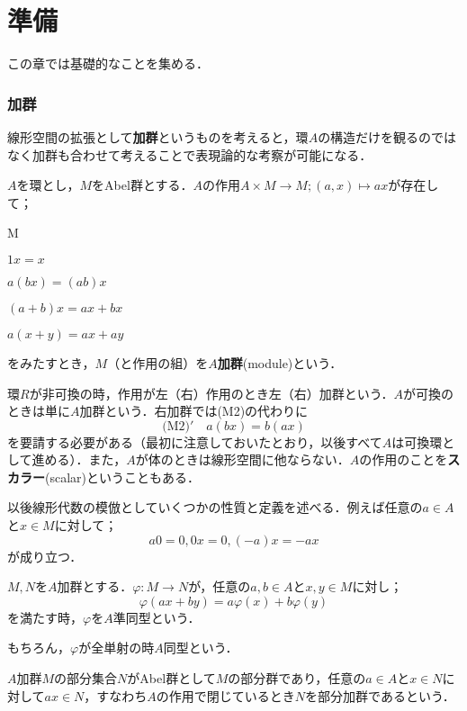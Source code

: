 \part[Preliminaries]{準備}
この章では基礎的なことを集める．

\section{加群}

線形空間の拡張として\textbf{加群}というものを考えると，環$A$の構造だけを観るのではなく加群も合わせて考えることで表現論的な考察が可能になる．

\begin{defi}[加群]
	$A$を環とし，$M$をAbel群とする．$A$の作用$A\times M\to M;(a,x)\mapsto ax$が存在して；
	\begin{defiterm}{M}
		\item $1x=x$
		\item $a(bx)=(ab)x$
		\item $(a+b)x=ax+bx$
		\item $a(x+y)=ax+ay$
	\end{defiterm}
	をみたすとき，$M$（と作用の組）を$A$\textbf{加群}(module)という．
\end{defi}

環$R$が非可換の時，作用が左（右）作用のとき左（右）加群という．$A$が可換のときは単に$A$加群という．右加群では(M2)の代わりに
\[\textrm{(M2)}'\quad a(bx)=b(ax)\]
を要請する必要がある（最初に注意しておいたとおり，以後すべて$A$は可換環として進める）．また，$A$が体のときは線形空間に他ならない．$A$の作用のことを\textbf{スカラー}(scalar)ということもある．

以後線形代数の模倣としていくつかの性質と定義を述べる．例えば任意の$a\in A$と$x\in M$に対して；
\[a0=0,0x=0,(-a)x=-ax\]
が成り立つ．

\begin{defi}[準同型]
	$M,N$を$A$加群とする．$\varphi:M\to N$が，任意の$a,b\in A$と$x,y\in M$に対し；
	\[\varphi(ax+by)=a\varphi(x)+b\varphi(y)\]
	を満たす時，$\varphi$を$A$準同型という．
\end{defi}

もちろん，$\varphi$が全単射の時$A$同型という．

\begin{defi}[部分加群]
	$A$加群$M$の部分集合$N$がAbel群として$M$の部分群であり，任意の$a\in A$と$x\in N$に対して$ax\in N，$すなわち$A$の作用で閉じているとき$N$を部分加群であるという．
\end{defi}

